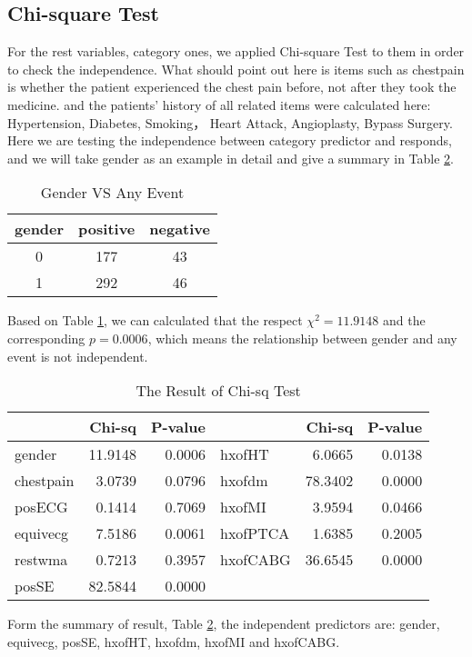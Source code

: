 \documentclass[a4paper,12pt]{article}
\begin{document}
  \subsection{Chi-square Test}
  For the rest variables, category ones, we applied Chi-square Test to them in order to check the independence. What should point out here is items such as chestpain is whether the patient experienced the chest pain before, not after they took the medicine. and the patients' history of all related items were calculated here: Hypertension, Diabetes, Smoking， Heart Attack, Angioplasty, Bypass Surgery.\\
  Here we are testing the independence between category predictor and responds, and we will take gender as an example in detail and give a summary in Table \ref{CT}.
    \begin{table}[htbp]
      \centering
      \caption{Gender VS Any Event}
        \begin{tabular}{c|cc}
        \toprule[1.5pt]
        gender & positive & negative \\
        \midrule
        0     & 177   & 43 \\
        1     & 292   & 46 \\
        \bottomrule[1.5pt]
        \end{tabular}%
      \label{GVE}%
    \end{table}%
  Based on Table \ref{GVE}, we can calculated that the respect $\chi^2 = 11.9148$ and the corresponding $p=0.0006$, which means the relationship between gender and any event is not independent.
    \begin{table}[htbp]
      \centering
      \caption{The Result of Chi-sq Test}
        \begin{tabular}{lrrlrr}
        \toprule[1.5pt]
              & Chi-sq & P-value &       & Chi-sq & P-value \\
        \midrule
        gender  & 11.9148 & 0.0006 & hxofHT  & 6.0665 & 0.0138 \\
        chestpain  & 3.0739 & 0.0796 & hxofdm  & 78.3402 & 0.0000 \\
        posECG  & 0.1414 & 0.7069 & hxofMI  & 3.9594 & 0.0466 \\
        equivecg  & 7.5186 & 0.0061 & hxofPTCA  & 1.6385 & 0.2005 \\
        restwma  & 0.7213 & 0.3957 & hxofCABG  & 36.6545 & 0.0000 \\
        posSE  & 82.5844 & 0.0000 &       &       &  \\
        \bottomrule[1.5pt]
        \end{tabular}%
      \label{CT}%
    \end{table}%
 Form the summary of result, Table \ref{CT}, the independent predictors are: gender, equivecg, posSE, hxofHT, hxofdm, hxofMI and hxofCABG.
\end{document}
